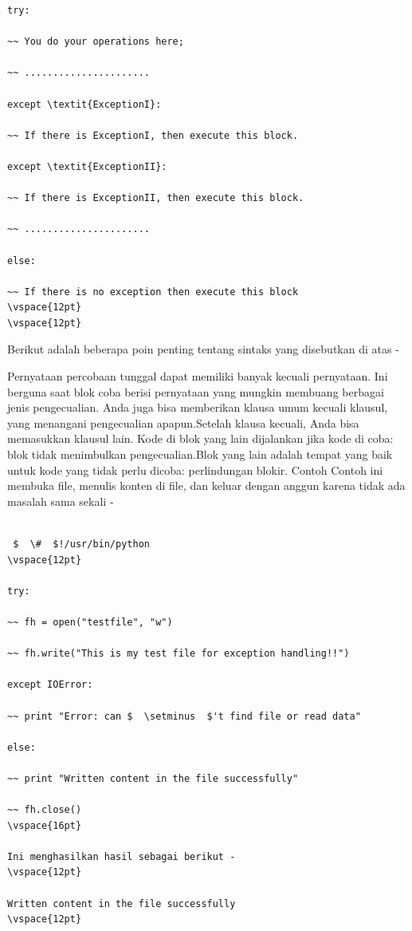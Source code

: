\begin{verbatim}
try: 

~~ You do your operations here; 

~~ ...................... 

except \textit{ExceptionI}: 

~~ If there is ExceptionI, then execute this block. 

except \textit{ExceptionII}: 

~~ If there is ExceptionII, then execute this block. 

~~ ...................... 

else: 

~~ If there is no exception then execute this block 
\vspace{12pt}
\vspace{12pt}

\end{verbatim}

Berikut adalah beberapa poin penting tentang sintaks yang disebutkan di atas - 

 \hspace*{0.5in} \vspace{12pt}
\vspace{12pt}

 \hspace*{0.5in} Pernyataan percobaan tunggal dapat memiliki banyak kecuali pernyataan. Ini berguna saat blok coba berisi pernyataan yang mungkin membuang berbagai jenis pengecualian. $  $Anda juga bisa memberikan klausa umum kecuali klausul, yang menangani pengecualian apapun.Setelah klausa kecuali, Anda bisa memasukkan klausul lain. Kode di blok yang lain dijalankan jika kode di coba: blok tidak menimbulkan pengecualian.Blok yang lain adalah tempat yang baik untuk kode yang tidak perlu dicoba: perlindungan blokir. Contoh Contoh ini membuka file, menulis konten di file, dan keluar dengan anggun karena tidak ada masalah sama sekali - 
\vspace{16pt}

\begin{verbatim}

 $  \#  $!/usr/bin/python 
\vspace{12pt}
 
try: 

~~ fh = open("testfile", "w") 

~~ fh.write("This is my test file for exception handling!!") 

except IOError: 

~~ print "Error: can $  \setminus  $'t find file or read data" 

else: 

~~ print "Written content in the file successfully" 

~~ fh.close() 
\vspace{16pt}

Ini menghasilkan hasil sebagai berikut - 
\vspace{12pt}

Written content in the file successfully 
\vspace{12pt}
 
 \end{verbatim}
 
